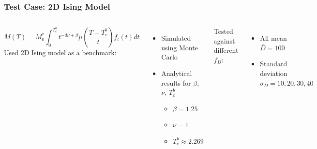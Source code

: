 \documentclass{beamer}
\begin{document}
\begin{frame}
	\frametitle{Test Case: 2D Ising Model}
	\begin{columns}
	\column{7cm}
		\small{
		$$
		M(T) = M_0^*\int_0^{T_c^b} t^{-d\nu +\beta} \tilde{\mu}\left(\frac{T-T_c^b}{t}\right) f_t(t) dt
		$$}
		Used 2D Ising model as a benchmark:
		\begin{itemize}
			\item{Simulated using Monte Carlo}
			\item{Analytical results for $\beta$, $\nu$, $T_c^b$}
			\begin{itemize}
				\item{$\beta = 1.25$}
				\item{$\nu=1$}
				\item{$T_c^b \approx 2.269$}
			\end{itemize}
		\end{itemize} \vspace{4mm}

		Tested against different $f_D$:
		\begin{itemize}
			\item{All mean $\bar{D}=100$}
			\item{Standard deviation $\sigma_D=10, 20, 30 ,40$}
		\end{itemize}
	\column{5cm}
		\includegraphics[width=4.5cm]{Images/distros}

		\includegraphics[width=4.5cm]{Images/unconst}
	\end{columns}
\end{frame}
\end{document}
